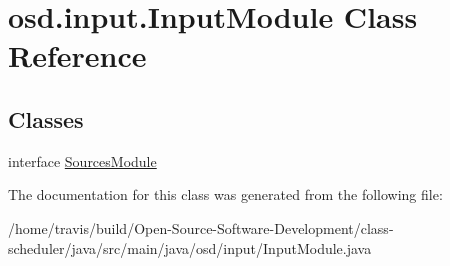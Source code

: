 \hypertarget{classosd_1_1input_1_1_input_module}{\section{osd.\-input.\-Input\-Module Class Reference}
\label{classosd_1_1input_1_1_input_module}
}
\subsection*{Classes}
\begin{DoxyCompactItemize}
\item 
interface \hyperlink{interfaceosd_1_1input_1_1_input_module_1_1_sources_module}{Sources\-Module}
\end{DoxyCompactItemize}


The documentation for this class was generated from the following file\-:\begin{DoxyCompactItemize}
\item 
/home/travis/build/\-Open-\/\-Source-\/\-Software-\/\-Development/class-\/scheduler/java/src/main/java/osd/input/Input\-Module.\-java\end{DoxyCompactItemize}
